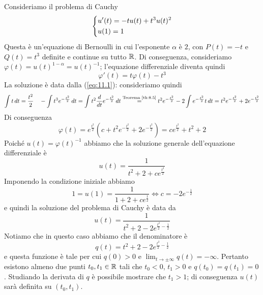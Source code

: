 \begin{example}
    Consideriamo il problema di Cauchy
    \[
    \begin{dcases}
        u'(t) = -t u(t) + t^3u(t)^2\\
        u(1) = 1
    \end{dcases}
    \]
    Questa è un'equazione di Bernoulli in cui l'esponente $\alpha$ è $2$, con $P(t) = -t$ e $Q(t) = t^3$ definite e continue su tutto $\amsbb{R}$. Di conseguenza, consideriamo $\varphi(t) = u(t)^{1-\alpha} = u(t)^{-1}$; l'equazione differenziale diventa quindi
    \[
    \varphi'(t) = t\varphi(t)-t^3
    \]
    La soluzione è data dalla (\ref{eq:11.1}): consideriamo quindi
    \[
    \int t\, dt = \frac{t^2}{2} \quad -\int t^3 e^{-\frac{t^2}{2}}\, dt = \int t^2 \frac{d}{dt}e^{-\frac{t^2}{2}}\, dt \overset{\text{Teorema \ref{th:8.5}}}{=} t^2e^{-\frac{t^2}{2}}-2\int e^{-\frac{t^2}{2}} t\, dt = t^2e^{-\frac{t^2}{2}}+2e^{-\frac{t^2}{2}}
    \]
    Di conseguenza
    \[
    \varphi(t) = e^{\frac{t^2}{2}}\left(c+t^2 e^{-\frac{t^2}{2}}+2e^{-\frac{t^2}{2}}\right) = ce^{\frac{t^2}{2}}+t^2+2
    \] 
    Poiché $u(t)= \varphi(t)^{-1}$ abbiamo che la soluzione generale dell'equazione differenziale è
    \[
    u(t) = \frac{1}{t^2+2+ce^{\frac{t^2}{2}}}
    \]
    Imponendo la condizione iniziale abbiamo
    \[
    1 = u(1) = \frac{1}{1+2+ce^{\frac{1}{2}}} \iff c = -2e^{-\frac{1}{2}}
    \]
    e quindi la soluzione del problema di Cauchy è data da
    \[
    u(t) = \frac{1}{t^2+2-2e^{\frac{t^2}{2}-\frac{1}{2}}}
    \]
    Notiamo che in questo caso abbiamo che il denominatore è
    \[
    q(t) = t^2+2-2e^{\frac{t^2}{2}-\frac{1}{2}}
    \]
    e questa funzione è tale per cui $q(0)>0$ e $\lim_{t\to\pm\infty}q(t) = -\infty$. Pertanto esistono almeno due punti $t_0, t_1\in\amsbb{R}$ tali che $t_0<0$, $t_1>0$ e $q(t_0) = q(t_1) = 0$. Studiando la derivata di $q$ è possibile mostrare che $t_1>1$; di conseguenza $u(t)$ sarà definita su $(t_0, t_1)$.
\end{example}
